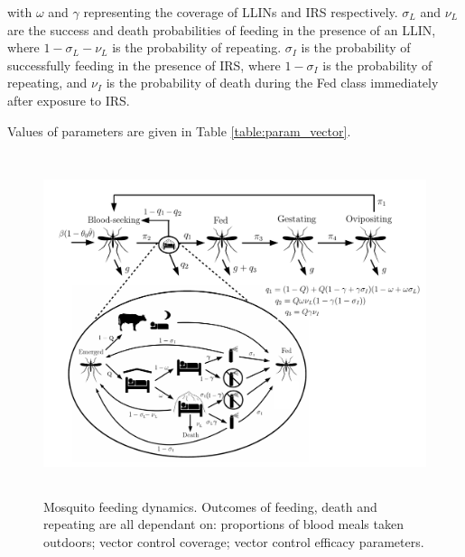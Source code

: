 with $\omega$ and $\gamma$ representing the coverage of LLINs and IRS respectively. $\sigma_L$ and $\nu_L$ are the success and death probabilities of feeding in the presence of an LLIN, where $1-\sigma_L - \nu_L$ is the probability of repeating. $\sigma_I$ is the probability of successfully feeding in the presence of IRS, where $1-\sigma_I$ is the probability of repeating, and $\nu_I$ is the probability of death during the Fed class immediately after exposure to IRS.

Values of parameters are given in Table \ref{table:param_vector}.

\begin{figure}[h]
\begin{center}
\includegraphics[height=10cm]{Project/Figures/VectorModel/Diagram_VC2019.pdf}
\caption{Mosquito feeding dynamics. Outcomes of feeding, death and repeating are all dependant on: proportions of blood meals taken outdoors; vector control coverage; vector control efficacy parameters.}
\label{fig:diag_vec}
\end{center}
\end{figure}

